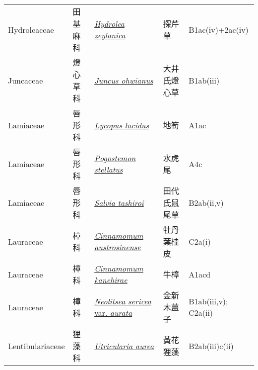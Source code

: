 {\begin{longtable}{L{2.5cm}L{2cm}L{5cm}L{2.5cm}L{3cm}}
    Hydroleaceae & 田基麻科 & \href{http://www.theplantlist.org/tpl1.1/search?q=Hydrolea+zeylanica}{\textit{Hydrolea zeylanica} } & 探芹草 & B1ac(iv)+2ac(iv)    \\
    Juncaceae & 燈心草科 & \href{http://www.theplantlist.org/tpl1.1/search?q=Juncus+ohwianus}{\textit{Juncus ohwianus} } & 大井氏燈心草 & B1ab(iii)    \\
    Lamiaceae & 唇形科 & \href{http://www.theplantlist.org/tpl1.1/search?q=Lycopus+lucidus}{\textit{Lycopus lucidus} } & 地筍 & A1ac    \\
    Lamiaceae & 唇形科 & \href{http://www.theplantlist.org/tpl1.1/search?q=Pogostemon+stellatus}{\textit{Pogostemon stellatus} } & 水虎尾 & A4c    \\
    Lamiaceae & 唇形科 & \href{http://www.theplantlist.org/tpl1.1/search?q=Salvia+tashiroi}{\textit{Salvia tashiroi} } & 田代氏鼠尾草 & B2ab(ii,v)    \\
    Lauraceae & 樟科 & \href{http://www.theplantlist.org/tpl1.1/search?q=Cinnamomum+austrosinense}{\textit{Cinnamomum austrosinense} } & 牡丹葉桂皮 & C2a(i)    \\
    Lauraceae & 樟科 & \href{http://www.theplantlist.org/tpl1.1/search?q=Cinnamomum+kanehirae}{\textit{Cinnamomum kanehirae} } & 牛樟 & A1acd    \\
    Lauraceae & 樟科 & \href{http://www.theplantlist.org/tpl1.1/search?q=Neolitsea+sericea+var.+aurata}{\textit{Neolitsea sericea} var. \textit{aurata} } & 金新木薑子 & B1ab(iii,v); C2a(ii)    \\
    Lentibulariaceae & 狸藻科 & \href{http://www.theplantlist.org/tpl1.1/search?q=Utricularia+aurea}{\textit{Utricularia aurea} } & 黃花狸藻 & B2ab(iii)c(ii)    \\

\end{longtable}}

